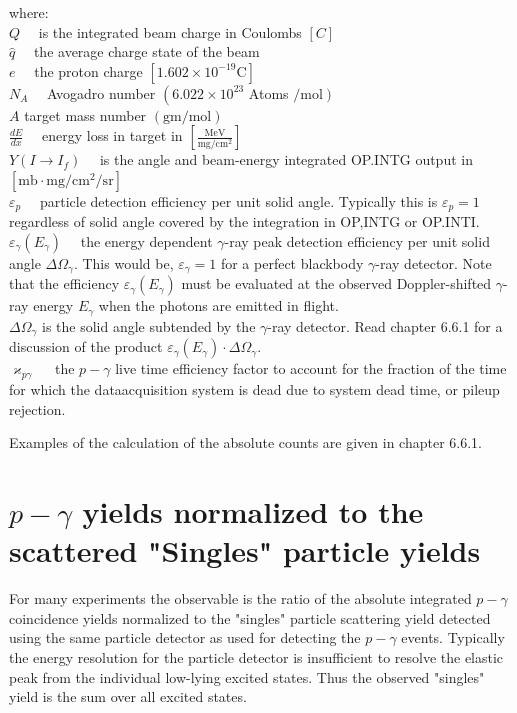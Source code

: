 \documentclass[10pt]{article}
\begin{document}
where:\\
$Q \quad$ is the integrated beam charge in Coulombs $[C]$\\
$\hat{q} \quad$ the average charge state of the beam\\
$e \quad$ the proton charge $\left[1.602 \times 10^{-19} \mathrm{C}\right]$\\
$N_{A} \quad$ Avogadro number $\left(6.022 \times 10^{23}\right.$ Atoms $\left./ \mathrm{mol}\right)$\\
$A$ target mass number $(\mathrm{gm} / \mathrm{mol})$\\
$\frac{d E}{d x} \quad$ energy loss in target in $\left[\frac{\mathrm{MeV}}{\mathrm{mg} / \mathrm{cm}^{2}}\right]$\\
$Y\left(I \rightarrow I_{f}\right) \quad$ is the angle and beam-energy integrated OP.INTG output in $\left[\mathrm{mb} \cdot \mathrm{mg} / \mathrm{cm}^{2} / \mathrm{sr}\right]$\\
$\varepsilon_{p} \quad$ particle detection efficiency per unit solid angle. Typically this is $\varepsilon_{p}=1$ regardless of solid angle covered by the integration in OP,INTG or OP.INTI.\\
$\varepsilon_{\gamma}\left(E_{\gamma}\right) \quad$ the energy dependent $\gamma$-ray peak detection efficiency per unit solid angle $\Delta \Omega_{\gamma}$. This would be, $\varepsilon_{\gamma}=1$ for a perfect blackbody $\gamma$-ray detector. Note that the efficiency $\varepsilon_{\gamma}\left(E_{\gamma}\right)$ must be evaluated at the observed Doppler-shifted $\gamma$-ray energy $E_{\gamma}$ when the photons are emitted in flight.\\
$\Delta \Omega_{\gamma}$ is the solid angle subtended by the $\gamma$-ray detector. Read chapter 6.6.1 for a discussion of the product $\varepsilon_{\gamma}\left(E_{\gamma}\right) \cdot \Delta \Omega_{\gamma}$.\\
$\varkappa_{p \gamma} \quad$ the $p-\gamma$ live time efficiency factor to account for the fraction of the time for which the dataacquisition system is dead due to system dead time, or pileup rejection.

Examples of the calculation of the absolute counts are given in chapter 6.6.1.

\section*{$p-\gamma$ yields normalized to the scattered "Singles" particle yields}
For many experiments the observable is the ratio of the absolute integrated $p-\gamma$ coincidence yields normalized to the "singles" particle scattering yield detected using the same particle detector as used for detecting the $p-\gamma$ events. Typically the energy resolution for the particle detector is insufficient to resolve the elastic peak from the individual low-lying excited states. Thus the observed "singles" yield is the sum over all excited states.
\end{document}
